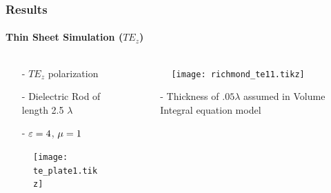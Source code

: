 \documentclass[mathserif,16pt,xcolor=table]{beamer}
\begin{document}
\begin{frame}
  \frametitle{Results}
  \framesubtitle{Thin Sheet Simulation ($TE_z$)}
  \begin{columns}[T] %
    \begin{column}{.5\textwidth}
      \begin{itemize}
        \item[-]{$TE_z$ polarization}
        \item[-]{Dielectric Rod of length 2.5 $\lambda$}
        \item[-]{$\varepsilon = 4$, $\mu = 1$}
      \end{itemize}
      \begin{figure}
        \centering
        \texttt{[image: te\_plate1.tikz]}
        \label{fig:te_plate}
      \end{figure}
    \end{column}
    \begin{column}[T]{.5\textwidth}
      \begin{figure}
        \vspace*{-1cm}
        \texttt{[image: richmond\_te11.tikz]}
        \label{fig:TE_rcs}
      \end{figure}
      \begin{itemize}
        \item[-]{Thickness of $.05 \lambda$ assumed in Volume Integral equation model}
      \end{itemize}
      \end{column}%
    \end{columns}
  \end{frame}
\end{document}
